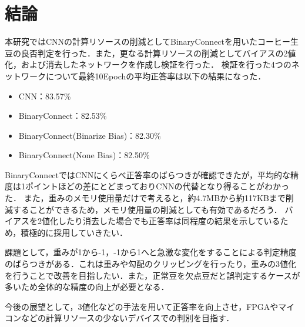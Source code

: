 \chapter{結論}
本研究ではCNNの計算リソースの削減としてBinaryConnectを用いたコーヒー生豆の良否判定を行った．また，更なる計算リソースの削減としてバイアスの2値化，および消去したネットワークを作成し検証を行った．
検証を行った4つのネットワークについて最終10Epochの平均正答率は以下の結果になった．
\begin{itemize}
  \item CNN：83.57\%
  \item BinaryConnect：82.53\%
  \item BinaryConnect(Binarize Bias)：82.30\%
  \item BinaryConnect(None Bias)：82.50\%
\end{itemize}

BinaryConnectではCNNにくらべ正答率のばらつきが確認できたが，平均的な精度は1ポイントほどの差にとどまっておりCNNの代替となり得ることがわかった．
また，重みのメモリ使用量だけで考えると，約4.7MBから約117KBまで削減することができるため，メモリ使用量の削減としても有効であるだろう．
バイアスを2値化したり消去した場合でも正答率は同程度の結果を示しているため，積極的に採用していきたい．

課題として，重みが1から-1，-1から1へと急激な変化をすることによる判定精度のばらつきがある．これは重みや勾配のクリッピングを行ったり，重みの3値化を行うことで改善を目指したい．また，正常豆を欠点豆だと誤判定するケースが多いため全体的な精度の向上が必要となる．

今後の展望として，3値化などの手法を用いて正答率を向上させ，FPGAやマイコンなどの計算リソースの少ないデバイスでの判別を目指す．